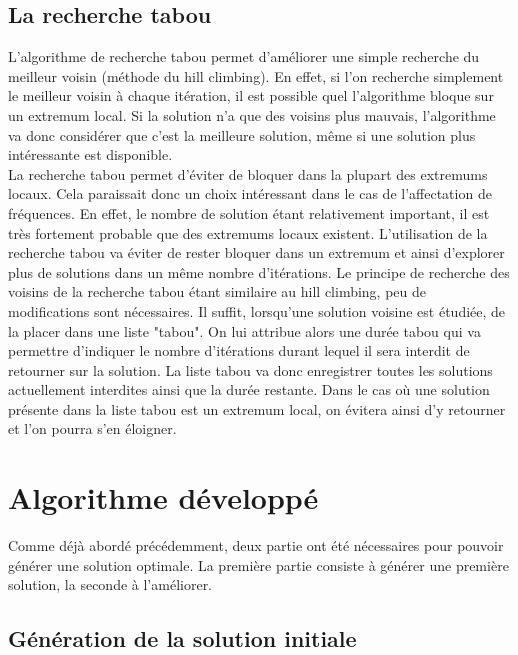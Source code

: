 \documentclass[a4paper, 11pt]{report}
\begin{document}
		\section{La recherche tabou}
		L'algorithme de recherche tabou permet d'améliorer une simple recherche du meilleur voisin (méthode du hill climbing). En effet, si l'on recherche simplement le meilleur voisin à chaque itération, il est possible quel l'algorithme bloque sur un extremum local. Si la solution n'a que des voisins plus mauvais, l'algorithme va donc considérer que c'est la meilleure solution, même si une solution plus intéressante est disponible.\\
		La recherche tabou permet d'éviter de bloquer dans la plupart des extremums locaux. Cela paraissait donc un choix intéressant dans le cas de l'affectation de fréquences. En effet, le nombre de solution étant relativement important, il est très fortement probable que des extremums locaux existent. L'utilisation de la recherche tabou va éviter de rester bloquer dans un extremum et ainsi d'explorer plus de solutions dans un même nombre d'itérations. Le principe de recherche des voisins de la recherche tabou étant similaire au hill climbing, peu de modifications sont nécessaires. Il suffit, lorsqu'une solution voisine est étudiée, de la placer dans une liste "tabou". On lui attribue alors une durée tabou qui va permettre d'indiquer le nombre d'itérations durant lequel il sera interdit de retourner sur la solution. La liste tabou va donc enregistrer toutes les solutions actuellement interdites ainsi que la durée restante. Dans le cas où une solution présente dans la liste tabou est un extremum local, on évitera ainsi d'y retourner et l'on pourra s'en éloigner.

\chapter{Algorithme développé}

	Comme déjà abordé précédemment, deux partie ont été nécessaires pour pouvoir générer une solution optimale. La première partie consiste à générer une première solution, la seconde à l'améliorer.

	\section{Génération de la solution initiale}
	
\end{document}
